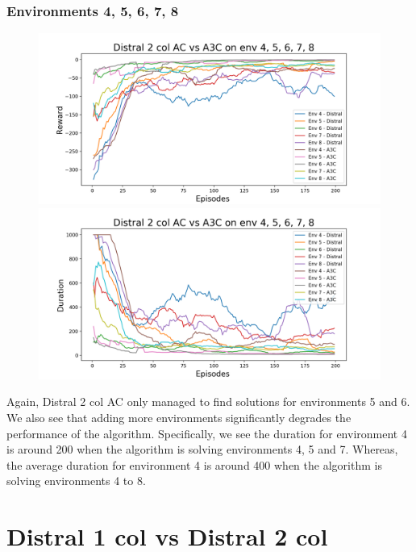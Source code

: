 \documentclass[12pt]{report}
\begin{document}
\subsubsection{Environments 4, 5, 6, 7, 8}
\begin{figure}[H]
\centering
\begin{minipage}{.5\textwidth}
\centering
\includegraphics[width=\textwidth]{figs/d2_col_ac/d2_col_ac_4_5_6_7_8_rwd.png}
\end{minipage}%
\centering
\begin{minipage}{.5\textwidth}
\centering
\includegraphics[width=\textwidth]{figs/d2_col_ac/d2_col_ac_4_5_6_7_8_dur.png}
\end{minipage}%
\end{figure}
Again, Distral 2 col AC only managed to find solutions for environments 5 and 6. We also see that adding more environments significantly degrades the performance of the algorithm. Specifically, we see the duration for environment 4 is around 200 when the algorithm is solving environments 4, 5 and 7. Whereas, the average duration for environment 4 is around 400 when the algorithm is solving environments 4 to 8.

\section{Distral 1 col vs Distral 2 col}
\end{document}
